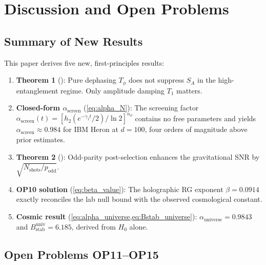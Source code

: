 \documentclass[12pt,a4paper]{article}
\theoremstyle{monette}
\theoremstyle{definition}
\newcommand{\SA}{S_A}
\newcommand{\asc}{\alpha_{\mathrm{screen}}}
\newcommand{\htwo}{h_2}
\newcommand{\nprt}{n_{\partial}}
\newcommand{\gamone}{\gamma_1}
\newcommand{\Tone}{T_1}
\newcommand{\Tphi}{T_\phi}
\newcommand{\alphaU}{\alpha_{\mathrm{universe}}}
\newcommand{\BU}{B_{\mathrm{stab}}^{\mathrm{univ}}}
\begin{document}
\section{Discussion and Open Problems}
\label{sec:discussion}

\subsection{Summary of New Results}

This paper derives five new, first-principles results:
\begin{enumerate}
  \item \textbf{Theorem 1} (): Pure dephasing $\Tphi$
        does not suppress $\SA$ in the high-entanglement regime.
        Only amplitude damping $\Tone$ matters.
  \item \textbf{Closed-form $\asc$} (\cref{eq:alpha_N}): The screening
        factor $\asc(t) = [\htwo(e^{-\gamone t}/2)/\ln 2]^{\nprt}$
        contains no free parameters and yields $\asc \approx 0.984$
        for IBM Heron at $d = 100$, four orders of magnitude above
        prior estimates.
  \item \textbf{Theorem 2} (): Odd-parity
        post-selection enhances the gravitational SNR by
        $\sqrt{N_{\mathrm{shots}}/p_{\mathrm{odd}}}$.
  \item \textbf{OP10 solution} (\cref{eq:beta_value}): The holographic
        RG exponent $\beta = 0.0914$ exactly reconciles the lab null
        bound with the observed cosmological constant.
  \item \textbf{Cosmic result} (\cref{eq:alpha_universe,eq:Bstab_universe}):
        $\alphaU = 0.9843$ and $\BU = 6.185$, derived from $H_0$ alone.
\end{enumerate}

\subsection{Open Problems OP11--OP15}
\end{document}
